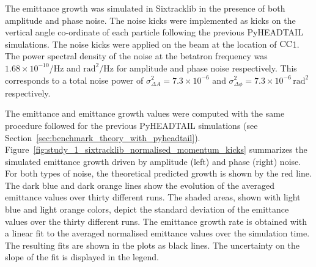 The emittance growth was simulated in Sixtracklib in the presence of both amplitude and phase noise. The noise kicks were implemented as kicks on the vertical angle co-ordinate of each particle following the previous PyHEADTAIL simulations. The noise kicks were applied on the beam at the location of ${\mathrm{CC}}$1. The power spectral density of the noise at the betatron frequency was $1.68\times 10^{-10}$/Hz and $\mathrm{rad^2/Hz}$ for amplitude and phase noise respectively. This corresponds to a total noise power of $\sigma_{\Delta A}^2=7.3\times 10^{-6}$ and $\sigma_{\Delta \phi}^2=7.3\times 10^{-6}$\,$\mathrm{rad^2}$ respectively.


The emittance and emittance growth values were computed with the same procedure followed for the previous PyHEADTAIL simulations (see Section~\ref{sec:benchmark_theory_with_pyheadtail}). Figure~\ref{fig:study_1_sixtracklib_normalised_momentum_kicks} summarizes the simulated emittance growth driven by amplitude (left) and phase (right) noise. For both types of noise, the theoretical predicted growth is shown by the red line. The dark blue and dark orange lines show the evolution of the averaged emittance values over thirty different runs. The shaded areas, shown with light blue and light orange colors, depict the standard deviation of the emittance values over the thirty different runs. The emittance growth rate is obtained with a linear fit to the averaged normalised emittance values over the simulation time. The resulting fits are shown in the plots as black lines. The uncertainty on the slope of the fit is displayed in the legend.


